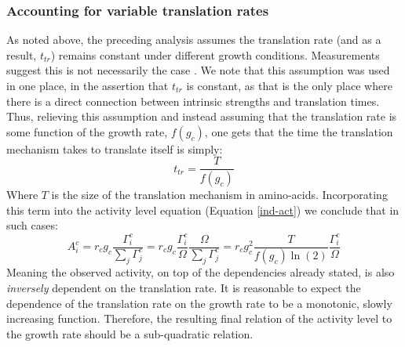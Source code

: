 \documentclass[a4page,notitlepage]{article}
\begin{document}
\subsubsection{Accounting for variable translation rates}
\label{nonconst-trans}
As noted above, the preceding analysis assumes the translation rate (and as a result, $t_{tr}$) remains constant under different growth conditions.
Measurements suggest this is not necessarily the case \parencite{Liang2000}.
We note that this assumption was used in one place, in the assertion that $t_{tr}$ is constant, as that is the only place where there is a direct connection between intrinsic strengths and translation times.
Thus, relieving this assumption and instead assuming that the translation rate is some function of the growth rate, $f(g_c)$, one gets that the time the translation mechanism takes to translate itself is simply:
\begin{equation}
t_{tr}=\frac{T}{f(g_c)}
\end{equation}
Where $T$ is the size of the translation mechanism in amino-acids.
Incorporating this term into the activity level equation (Equation \ref{ind-act}) we conclude that in such cases:
\begin{equation}
A^c_i=r_c g_c \frac{\Gamma^c_i}{\sum_{j}\Gamma^c_j}=r_c g_c \frac{\Gamma^c_i}{\Omega}\frac{\Omega}{\sum_{j}\Gamma^c_j}=r_c g_c^2\frac{T}{f(g_c)\ln(2)}\frac{\Gamma^c_i}{\Omega}
\end{equation}
Meaning the observed activity, on top of the dependencies already stated, is also \emph{inversely} dependent on the translation rate.
It is reasonable to expect the dependence of the translation rate on the growth rate to be a monotonic, slowly increasing function.
Therefore, the resulting final relation of the activity level to the growth rate should be a sub-quadratic relation.
\end{document}
